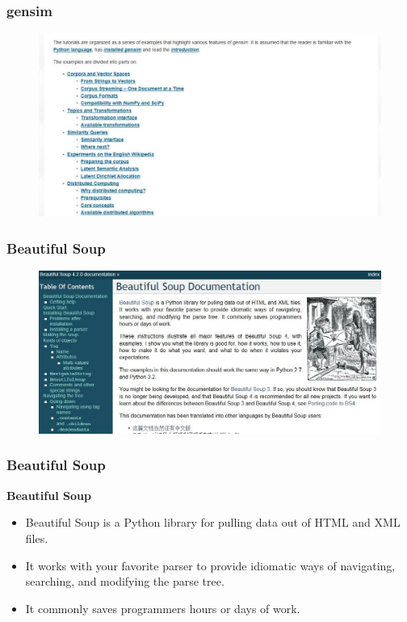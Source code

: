 \documentclass[MASTER.tex]{subfiles}
\begin{document}
\begin{frame}
	\frametitle{gensim}
\begin{figure}
	\centering
	\includegraphics[width=1.05\linewidth]{gensimtutorials}

\end{figure}
\end{frame}
\begin{frame}
	\frametitle{Beautiful Soup}
	\begin{figure}
\centering
\includegraphics[width=1.05\linewidth]{beautifulsoup}

\end{figure}

\end{frame}
\begin{frame}
\frametitle{Beautiful Soup}
\textbf{Beautiful Soup}\Large
\large
\begin{itemize}
\item Beautiful Soup is a Python library for pulling data out of HTML and XML files. 
\item It works with your favorite parser to provide idiomatic ways of navigating, searching, and modifying the parse tree. 
\item It commonly saves programmers hours or days of work.
\end{itemize}
\end{frame}
\end{document}
